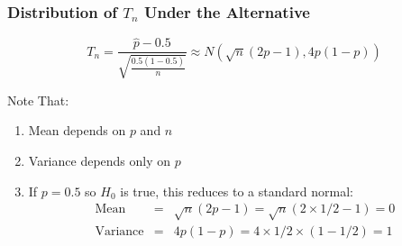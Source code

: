 \documentclass[handout]{beamer}
\begin{document}
\begin{frame}[c]\frametitle{Distribution of $T_n$ Under the Alternative}
    
    $$\boxed{T_n =\frac{\widehat{p} - 0.5}{\sqrt{\frac{0.5(1-0.5)}{n}}} \approx N\left(\sqrt{n}(2p-1), 4p(1-p) \right)}$$

\begin{block}
	{Note That:}
	\begin{enumerate}
		\item Mean depends on $p$ and $n$
		\item Variance depends only on $p$
		\item If $p=0.5$ so $H_0$ is true, this reduces to a standard normal:
		\begin{eqnarray*}
		\mbox{Mean} &=&  \sqrt{n}(2p-1) = \sqrt{n}(2\times 1/2 - 1) = 0\\
			\mbox{Variance} &=& 4p(1-p) = 4 \times 1/2 \times (1 - 1/2) = 1\\
		\end{eqnarray*}
	\end{enumerate}
\end{block}

\end{frame}
\end{document}

